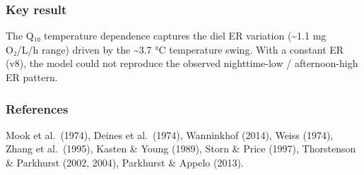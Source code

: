\documentclass[
  letterpaper,
  DIV=11,
  numbers=noendperiod]{scrartcl}
\begin{document}
\subsubsection{Key result}\label{key-result}

The Q₁₀ temperature dependence captures the diel ER variation
(\textasciitilde1.1 mg O₂/L/h range) driven by the \textasciitilde3.7 °C
temperature swing. With a constant ER (v8), the model could not
reproduce the observed nighttime-low / afternoon-high ER pattern.

\subsubsection{References}\label{references}

Mook et al.~(1974), Deines et al.~(1974), Wanninkhof (2014), Weiss
(1974), Zhang et al.~(1995), Kasten \& Young (1989), Storn \& Price
(1997), Thorstenson \& Parkhurst (2002, 2004), Parkhurst \& Appelo
(2013).
\end{document}
